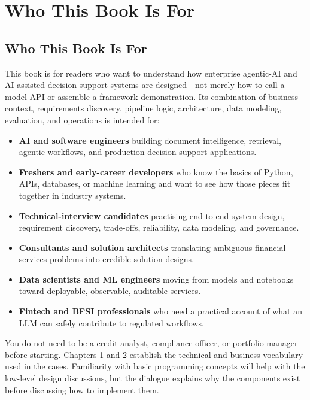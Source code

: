 \chapter*{Who This Book Is For}

\section*{Who This Book Is For}

This book is for readers who want to understand how enterprise agentic-AI and AI-assisted decision-support systems are designed---not merely how to call a model API or assemble a framework demonstration. Its combination of business context, requirements discovery, pipeline logic, architecture, data modeling, evaluation, and operations is intended for:

\begin{itemize}
\item \textbf{AI and software engineers} building document intelligence, retrieval, agentic workflows, and production decision-support applications.
\item \textbf{Freshers and early-career developers} who know the basics of Python, APIs, databases, or machine learning and want to see how those pieces fit together in industry systems.
\item \textbf{Technical-interview candidates} practising end-to-end system design, requirement discovery, trade-offs, reliability, data modeling, and governance.
\item \textbf{Consultants and solution architects} translating ambiguous financial-services problems into credible solution designs.
\item \textbf{Data scientists and ML engineers} moving from models and notebooks toward deployable, observable, auditable services.
\item \textbf{Fintech and BFSI professionals} who need a practical account of what an LLM can safely contribute to regulated workflows.
\end{itemize}
You do not need to be a credit analyst, compliance officer, or portfolio manager before starting. Chapters 1 and 2 establish the technical and business vocabulary used in the cases. Familiarity with basic programming concepts will help with the low-level design discussions, but the dialogue explains why the components exist before discussing how to implement them.
